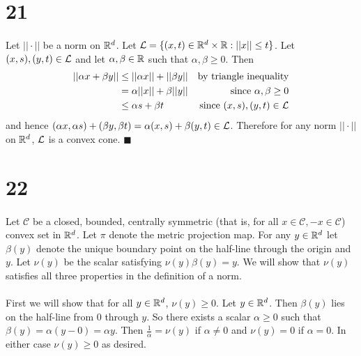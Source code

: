\documentclass[letterpaper,12pt,oneside,onecolumn]{article}
\newcommand{\cC}{\mathcal{C}} \newcommand{\cD}{\mathcal{D}}
\begin{document}
\section*{21}
\paragraph{}
Let $||\cdot||$ be a norm on $\mathbb{R}^d$. Let $\mathcal{L} = \{(x,t) \in \mathbb{R}^d \times \mathbb{R}: ||x|| \leq t\}$. Let $(x,s), (y,t) \in \mathcal{L}$ and let $\alpha, \beta \in \mathbb{R}$ such that $\alpha, \beta \geq 0$. Then 
\begin{align*}
||\alpha x +\beta y|| &\leq ||\alpha x|| + ||\beta y|| &\text{by triangle inequality} \\
&= \alpha ||x|| + \beta ||y|| &\text{since $\alpha, \beta \geq 0$} \\
&\leq \alpha s + \beta t &\text{since $(x,s), (y,t) \in \mathcal{L}$}
\end{align*}
and hence $(\alpha x, \alpha s) + (\beta y, \beta t)  = \alpha(x,s) + \beta(y,t)\in \mathcal{L}$. Therefore for any norm $||\cdot ||$ on $\mathbb{R}^d$, $\mathcal{L}$ is a convex cone. $\blacksquare$
\section*{22}
\paragraph{}
Let $\cC$ be a closed, bounded, centrally symmetric (that is, for all $x \in \cC, -x\in \cC$) convex set in $\mathbb{R}^d$. Let $\pi$ denote the metric projection map. For any $y \in \mathbb{R}^d$ let $\beta(y)$ denote the unique boundary point on the half-line through the origin and $y$. Let $\nu(y)$ be the scalar satisfying $\nu(y)\beta(y) = y$. We will show that $\nu(y)$ satisfies all three properties in the definition of a norm.
\paragraph{}
First we will show that for all $y \in \mathbb{R}^d$, $\nu(y) \geq 0$. Let $y \in \mathbb{R}^d$. Then $\beta(y)$ lies on the half-line from $0$ through $y$. So there exists a scalar $\alpha \geq 0$ such that $\beta(y) = \alpha (y-0) = \alpha y$. Then $\frac{1}{\alpha} = \nu(y)$ if $\alpha \neq 0$ and $\nu(y) = 0$ if $\alpha = 0$. In either case $\nu(y) \geq 0$ as desired.
\end{document}
